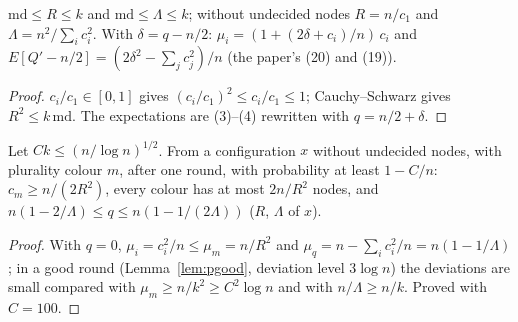 \begin{lemma}\label{lem:lb-basic}
\leanok{}
$\mathrm{md}\le R\le k$ and $\mathrm{md}\le\Lambda\le k$; without undecided nodes $R=n/c_1$ and
$\Lambda=n^2/\sum_ic_i^2$. With $\delta=q-n/2$: $\mu_i=(1+(2\delta+c_i)/n)\,c_i$ and
$E[Q'-n/2]=(2\delta^2-\sum_jc_j^2)/n$ (the paper's (20) and (19)).
\end{lemma}
\begin{proof}\leanok
$c_i/c_1\in[0,1]$ gives $(c_i/c_1)^2\le c_i/c_1\le1$; Cauchy--Schwarz gives $R^2\le k\,\mathrm{md}$.
The expectations are (3)--(4) rewritten with $q=n/2+\delta$.
\end{proof}

\begin{lemma}\label{lem:lb-first}
\leanok{}
Let $Ck\le(n/\log n)^{1/2}$. From a configuration $x$ without undecided nodes, with plurality
colour $m$, after one round, with probability at least $1-C/n$: $c_m\ge n/(2R^2)$, every colour has
at most $2n/R^2$ nodes, and $n(1-2/\Lambda)\le q\le n(1-1/(2\Lambda))$ ($R$, $\Lambda$ of $x$).
\end{lemma}
\begin{proof}\leanok
With $q=0$, $\mu_i=c_i^2/n\le\mu_m=n/R^2$ and $\mu_q=n-\sum_ic_i^2/n=n(1-1/\Lambda)$; in a good
round (Lemma~\ref{lem:pgood}, deviation level $3\log n$) the deviations are small compared with
$\mu_m\ge n/k^2\ge C^2\log n$ and with $n/\Lambda\ge n/k$. Proved with $C=100$.
\end{proof}

